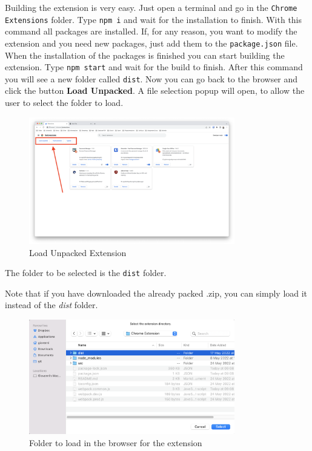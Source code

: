Building the extension is very easy. Just open a terminal and go in the \texttt{Chrome Extensions} folder. Type \texttt{npm i} and wait for the installation to finish. With this command all packages are installed. If, for any reason, you want to modify the extension and you need new packages, just add them to the \texttt{package.json} file.
When the installation of the packages is finished you can start building the extension. Type \texttt{npm start} and wait for the build to finish. After this command you will see a new folder called \texttt{dist}.
Now you can go back to the browser and click the button \textbf{Load Unpacked}. A file selection popup will open, to allow the user to select the folder to load.
\begin{figure}[htb]
	\centering
	\includegraphics[width=0.8\textwidth]{images/extension/load-unpacked.png}
	\caption{Load Unpacked Extension}
	\label{fig:load_unpacked}
\end{figure}
The folder to be selected is the \texttt{dist} folder. 

Note that if you have downloaded the already packed .zip, you can simply load it instead of the \textit{dist} folder.
\begin{figure}[htb]
	\centering
	\includegraphics[width=0.8\textwidth]{images/extension/dist.png}
	\caption{Folder to load in the browser for the extension}
	\label{fig:dist}
\end{figure}

